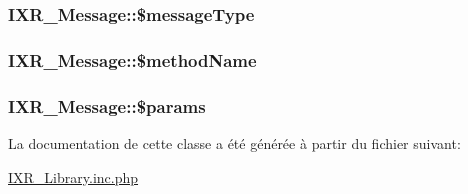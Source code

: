 \hypertarget{classIXR__Message_o1}{
\subsubsection[\$messageType]{\setlength{\rightskip}{0pt plus 5cm}IXR\_\-Message::\$message\-Type}}
\label{classIXR__Message_o1}


\hypertarget{classIXR__Message_o4}{
\subsubsection[\$methodName]{\setlength{\rightskip}{0pt plus 5cm}IXR\_\-Message::\$method\-Name}}
\label{classIXR__Message_o4}


\hypertarget{classIXR__Message_o5}{
\subsubsection[\$params]{\setlength{\rightskip}{0pt plus 5cm}IXR\_\-Message::\$params}}
\label{classIXR__Message_o5}




La documentation de cette classe a \'{e}t\'{e} g\'{e}n\'{e}r\'{e}e \`{a} partir du fichier suivant:\begin{CompactItemize}
\item 
\hyperlink{IXR__Library_8inc_8php}{IXR\_\-Library.inc.php}\end{CompactItemize}
